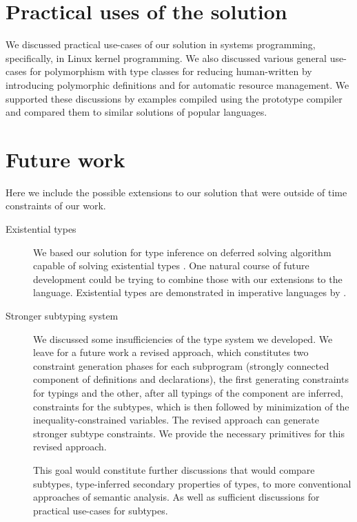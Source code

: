\section*{Practical uses of the solution}

We discussed practical use-cases of our solution in systems programming, specifically, in Linux kernel programming. We also discussed various general use-cases for polymorphism with type classes for reducing human-written by introducing polymorphic definitions and for automatic resource management. We supported these discussions by examples compiled using the prototype compiler and compared them to similar solutions of popular languages.

\section*{Future work}

Here we include the possible extensions to our solution that were outside of time constraints of our work.

\begin{description}
    \item[Existential types] We based our solution for type inference on deferred solving algorithm capable of solving existential types \cite{vytiniotis2011outsidein}. One natural course of future development could be trying to combine those with our extensions to the language. Existential types are demonstrated in imperative languages by \citet{grossman2002existential}.

    \item[Stronger subtyping system] We discussed some insufficiencies of the type system we developed. We leave for a future work a revised approach, which constitutes two constraint generation phases for each subprogram (strongly connected component of definitions and declarations), the first generating constraints for typings and the other, after all typings of the component are inferred, constraints for the subtypes, which is then followed by minimization of the inequality-constrained variables. The revised approach can generate stronger subtype constraints. We provide the necessary primitives for this revised approach.

    This goal would constitute further discussions that would compare subtypes, type-inferred secondary properties of types, to more conventional approaches of semantic analysis. As well as sufficient discussions for practical use-cases for subtypes.
\end{description}
